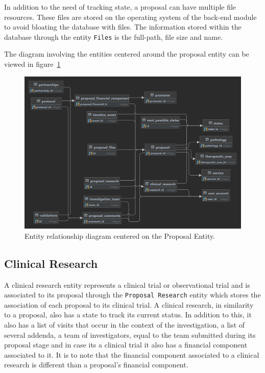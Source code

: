 In addition to the need of tracking state, a proposal can have multiple file resources.
These files are stored on the operating system of the back-end module to avoid bloating the database with files. The information stored within the database through the entity \lstinline{Files} is the full-path, file size and name.

The diagram involving the entities centered around the proposal entity can be viewed in figure~\ref{fig:er-diagram-proposal}

\begin{figure}[H]
    \centering
    \includegraphics[scale=0.15]{Chapters/img/model/Proposal-centered-er-diagram.png}
    \caption{Entity relationship diagram centered on the Proposal Entity.}
    \label{fig:er-diagram-proposal}
\end{figure}

\subsection{Clinical Research}
A clinical research entity represents a clinical trial or observational trial and is associated to its proposal through the \lstinline{Proposal Research} entity which stores the association of each proposal to its clinical trial. A clinical research, in similarity to a proposal, also has a state to track its current status. In addition to this, it also has a list of visits that occur in the context of the investigation, a list of several addenda, a team of investigators, equal to the team submitted during its proposal stage and in case its a clinical trial it also has a financial component associated to it. It is to note that the financial component associated to a clinical research is different than a proposal's financial component. 


